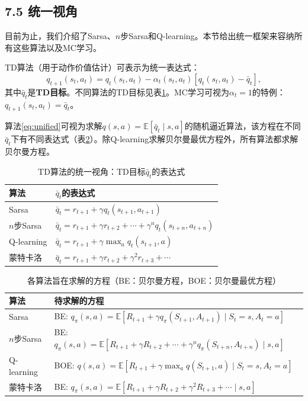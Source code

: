 \documentclass[UTF8]{article}
\begin{document}
\subsection*{7.5 统一视角}

目前为止，我们介绍了Sarsa、$n$步Sarsa和Q-learning。本节给出统一框架来容纳所有这些算法以及MC学习。

TD算法（用于动作价值估计）可表示为统一表达式：
\begin{equation}
q_{t+1}(s_t, a_t) = q_t(s_t, a_t) - \alpha_t(s_t, a_t)[q_t(s_t, a_t) - \bar{q}_t],
\label{eq:unified}
\end{equation}
其中$\bar{q}_t$是\textbf{TD目标}。不同算法的TD目标见表\ref{tab:unified}。MC学习可视为$\alpha_t = 1$的特例：$q_{t+1}(s_t, a_t) = \bar{q}_t$。

算法\eqref{eq:unified}可视为求解$q(s, a) = \mathbb{E}[\bar{q}_t \mid s, a]$的随机逼近算法，该方程在不同$\bar{q}_t$下有不同表达式（表\ref{tab:equations}）。除Q-learning求解贝尔曼最优方程外，所有算法都求解贝尔曼方程。

\begin{table}[h]
\centering
\caption{TD算法的统一视角：TD目标$\bar{q}_t$的表达式}
\label{tab:unified}
\renewcommand{\arraystretch}{1.4}
\begin{tabular}{|l|l|}
\hline
\textbf{算法} & \textbf{$\bar{q}_t$的表达式} \\
\hline
Sarsa & $\bar{q}_t = r_{t+1} + \gamma q_t(s_{t+1}, a_{t+1})$ \\
\hline
$n$步Sarsa & $\bar{q}_t = r_{t+1} + \gamma r_{t+2} + \cdots + \gamma^n q_t(s_{t+n}, a_{t+n})$ \\
\hline
Q-learning & $\bar{q}_t = r_{t+1} + \gamma \max_a q_t(s_{t+1}, a)$ \\
\hline
蒙特卡洛 & $\bar{q}_t = r_{t+1} + \gamma r_{t+2} + \gamma^2 r_{t+3} + \cdots$ \\
\hline
\end{tabular}
\end{table}

\begin{table}[h]
\centering
\caption{各算法旨在求解的方程（BE：贝尔曼方程，BOE：贝尔曼最优方程）}
\label{tab:equations}
\renewcommand{\arraystretch}{1.4}
\begin{tabular}{|l|l|}
\hline
\textbf{算法} & \textbf{待求解的方程} \\
\hline
Sarsa & BE: $q_\pi(s, a) = \mathbb{E}[R_{t+1} + \gamma q_\pi(S_{t+1}, A_{t+1}) \mid S_t = s, A_t = a]$ \\
\hline
$n$步Sarsa & BE: $q_\pi(s, a) = \mathbb{E}[R_{t+1} + \gamma R_{t+2} + \cdots + \gamma^n q_\pi(S_{t+n}, A_{t+n}) \mid s, a]$ \\
\hline
Q-learning & BOE: $q(s, a) = \mathbb{E}[R_{t+1} + \gamma \max_a q(S_{t+1}, a) \mid S_t = s, A_t = a]$ \\
\hline
蒙特卡洛 & BE: $q_\pi(s, a) = \mathbb{E}[R_{t+1} + \gamma R_{t+2} + \gamma^2 R_{t+3} + \cdots \mid s, a]$ \\
\hline
\end{tabular}
\end{table}
\end{document}
